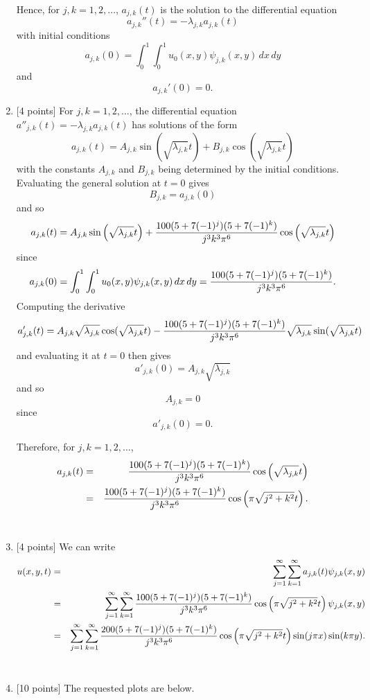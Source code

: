 \begin{solution}
\begin{enumerate}
Hence, for $j,k=1,2,\ldots$, $a_{j,k}(t)$ is the solution to the differential equation
\[
a_{j,k}''(t)=-\lambda_{j,k} a_{j,k}(t)
\]
with initial conditions
\[
a_{j,k}(0)=\int_0^1\int_0^1u_0(x,y)\psi_{j,k}(x,y)\,dx\,dy
\]
and
\[
a_{j,k}'(0)=0.
\]

\item {[4 points]} For $j,k=1,2,\ldots$, the differential equation $a''_{j,k}(t) = -\lambda_{j,k} a_{j,k}(t)$ has solutions of the form
\[
a_{j,k}(t) = A_{j,k}\sin\left(\sqrt{\lambda_{j,k}} t\right)+B_{j,k}\cos\left(\sqrt{\lambda_{j,k}} t\right)
\]
with the constants $A_{j,k}$ and $B_{j,k}$ being determined by the initial conditions. Evaluating the general solution at $t=0$ gives
\[
B_{j,k}=a_{j,k}(0)
\]
and so
\[
a_{j,k}(t) = A_{j,k}\sin\left(\sqrt{\lambda_{j,k}} t\right)+{100 (5+7(-1)^j)(5+7(-1)^k)\over j^3 k^3 \pi^6}\cos\left(\sqrt{\lambda_{j,k}} t\right)
\]
since
\[
a_{j,k}(0)=\int_0^1\int_0^1u_0(x,y)\psi_{j,k}(x,y)\,dx\,dy={100 (5+7(-1)^j)(5+7(-1)^k)\over j^3 k^3 \pi^6}.
\]
Computing the derivative
\[
a'_{j,k}(t) = A_{j,k}\sqrt{\lambda_{j,k}} \cos(\sqrt{\lambda_{j,k}} t) - {100 (5+7(-1)^j)(5+7(-1)^k)\over j^3 k^3 \pi^6}\sqrt{\lambda_{j,k}} \sin(\sqrt{\lambda_{j,k}} t)
\]
and evaluating it at $t=0$ then gives
\[
a'_{j,k}(0) = A_{j,k}\sqrt{\lambda_{j,k}}
\]
and so
\[
A_{j,k} = 0
\]
since
\[
a'_{j,k}(0) = 0.
\]

Therefore, for $j,k=1,2,\ldots$,
\begin{eqnarray*}
a_{j,k}(t)&=&{100 (5+7(-1)^j)(5+7(-1)^k)\over j^3 k^3 \pi^6}\cos\left(\sqrt{\lambda_{j,k}} t\right)
\\
&=&{100 (5+7(-1)^j)(5+7(-1)^k)\over j^3 k^3 \pi^6}\cos\left(\pi\sqrt{j^2+k^2} t\right).
\end{eqnarray*}
\\
\item {[4 points]} We can write
\begin{eqnarray*}
u(x,y,t) &=& \sum_{j=1}^\infty \sum_{k=1}^\infty a_{j,k}(t) \psi_{j,k}(x,y)
\\
&=& \sum_{j=1}^\infty \sum_{k=1}^\infty {100 (5+7(-1)^j)(5+7(-1)^k)\over j^3 k^3 \pi^6}\cos\left(\pi\sqrt{j^2+k^2} t\right) \psi_{j,k}(x,y)
\\
&=& \sum_{j=1}^\infty \sum_{k=1}^\infty {200 (5+7(-1)^j)(5+7(-1)^k)\over j^3 k^3 \pi^6}\cos\left(\pi\sqrt{j^2+k^2} t\right) \sin(j\pi x)\sin(k\pi y).
\end{eqnarray*}
\\
\item {[10 points]} The requested plots are below.


\end{enumerate}
\end{solution}
